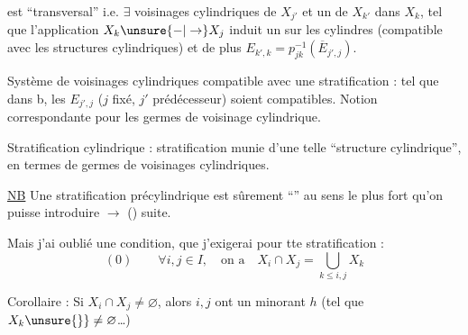 est ``transversal'' i.e.  $\exists$ voisinages cylindriques
de $X_{j'}$  et un de $X_{k'}$ dans $X_k$, tel que l'application
$X_k\unsure{-|\to}X_j$ induit un  sur les
cylindres (compatible avec les structures
cylindriques) et de plus
$E_{k',k}=p_{jk}^{-1}(\overline E_{j',j})$.

Système de voisinages cylindriques 
compatible avec une stratification : tel que
dans b, les $E_{j',j}$ ($j$ fixé, $j'$ prédécesseur)
soient compatibles. Notion correspondante
pour les germes de voisinage cylindrique.

Stratification cylindrique : stratification munie
d'une telle ``structure cylindrique'', en
termes de germes de voisinages cylindriques.

\uline{NB} Une stratification précylindrique 
est sûrement
``'' au sens le plus fort qu'on
puisse introduire $\to$ () suite.

Mais j'ai oublié une condition, que j'exigerai
pour tte stratification :
\[
(0)\qquad \forall i,j\in I,\quad\text{on a}\quad
X_i\cap X_j=\bigcup_{k\le i,j}X_k
\]

Corollaire : Si $X_i\cap X_j\ne\varnothing$, alors $i,j$ ont un
minorant $h$ (tel que  $X_k\unsure{\}}\ne\varnothing$\ldots)
